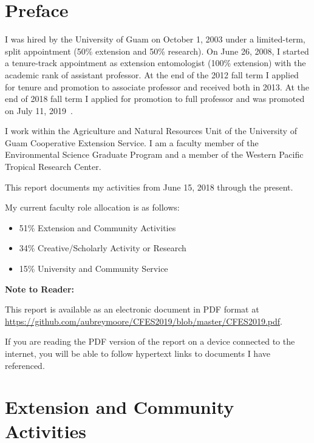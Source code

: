 \section{Preface}
\begin{refsection}
	
I was hired by the University of Guam on October 1, 2003 under a limited-term,
split appointment (50\% extension and 50\% research). On June 26,
2008, I started a tenure-track appointment as extension entomologist
(100\% extension) with the academic rank of assistant professor. At
the end of the 2012 fall term I applied for tenure and promotion to associate professor and
received both in 2013. At the end of 2018 fall term I applied for promotion to
full professor and was promoted on July 11, 2019~\cite{recommendation_for_promotion2019}. 

I work within the Agriculture and Natural Resources Unit of the University
of Guam Cooperative Extension Service. I am a faculty member of the
Environmental Science Graduate Program and a member of the Western
Pacific Tropical Research Center. 

This report documents my activities from June 15, 2018 through the present.

My current faculty role allocation is as follows:
\begin{itemize}
	\item 51\% Extension and Community Activities 
	\item 34\% Creative/Scholarly Activity or Research 
	\item 15\% University and Community Service
\end{itemize}

\textbf{Note to Reader:}

This report is available as an electronic document in PDF format at\\
\url{https://github.com/aubreymoore/CFES2019/blob/master/CFES2019.pdf}. 

If you are reading the PDF version of the report on a device connected
to the internet, you will be able to follow hypertext links to documents
I have referenced.

\printbibliography

\end{refsection} 

\pagebreak

\section{Extension and Community Activities}

